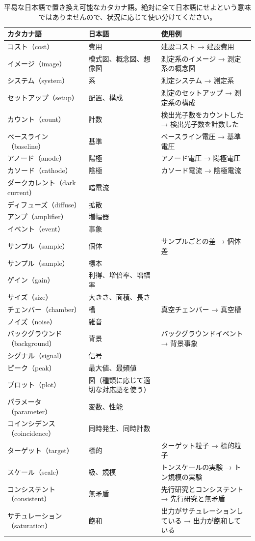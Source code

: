 \begin{landscape}
  \begin{longtable}{lll}
  \caption{平易な日本語で置き換え可能なカタカナ語。絶対に全て日本語にせよという意味ではありませんので、状況に応じて使い分けてください。} \\
    \hline
    カタカナ語 & 日本語 & 使用例 \\
    \hline
    コスト（cost） & 費用 & 建設コスト → 建設費用 \\
    イメージ（image） & 模式図、概念図、想像図 & 測定系のイメージ → 測定系の概念図 \\
    システム（system） & 系 & 測定システム → 測定系 \\
    セットアップ（setup） & 配置、構成 & 測定のセットアップ → 測定系の構成 \\
    カウント（count） & 計数 & 検出光子数をカウントした → 検出光子数を計数した \\
    ベースライン（baseline） & 基準 & ベースライン電圧 → 基準電圧 \\
    アノード（anode） & 陽極 & アノード電圧 → 陽極電圧 \\
    カソード（cathode） & 陰極 & カソード電流 → 陰極電流 \\
    ダークカレント（dark current） & 暗電流 & \\
    ディフューズ（diffuse） & 拡散 & \\
    アンプ（amplifier） & 増幅器 & \\
    イベント（event） & 事象 & \\
    サンプル（sample） & 個体 & サンプルごとの差 → 個体差 \\
    サンプル（sample） & 標本 & \\
    ゲイン（gain） & 利得、増倍率、増幅率 & \\
    サイズ（size） & 大きさ、面積、長さ & \\
    チェンバー（chamber） & 槽 & 真空チェンバー → 真空槽 \\
    ノイズ（noise） & 雑音 &  \\
    バックグラウンド（background） & 背景 & バックグラウンドイベント → 背景事象 \\
    シグナル（signal） & 信号 &  \\
    ピーク（peak） & 最大値、最頻値 &  \\
    プロット（plot） & 図（種類に応じて適切な対応語を使う） &  \\
    パラメータ（parameter） & 変数、性能 &  \\
    コインシデンス（coincidence） & 同時発生、同時計数 &  \\
    ターゲット（target） & 標的 & ターゲット粒子 → 標的粒子 \\
    スケール（scale） & 級、規模 & トンスケールの実験 → トン規模の実験 \\
    コンシステント（consistent） & 無矛盾 & 先行研究とコンシステント → 先行研究と無矛盾 \\
    サチュレーション（saturation） & 飽和 & 出力がサチュレーションしている → 出力が飽和している \\
    \hline
  \end{longtable}
  \label{katakana}
\end{landscape}

